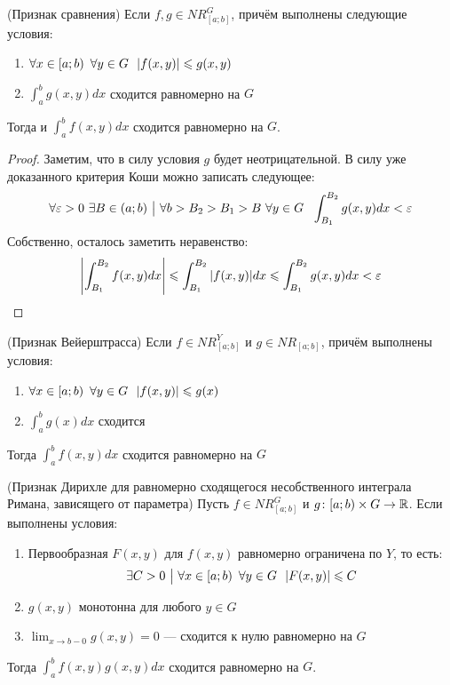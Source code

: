 \begin{theorem} (Признак сравнения)
	Если $f, g \in NR_{[a; b]}^G$, причём выполнены следующие условия:
	\begin{enumerate}
		\item $\forall x \in \left[a; b\right)\ \forall y \in G\ \ |f(x, y)| \leqslant g(x, y)$
		
		\item $\int_a^b g(x, y)dx$ сходится равномерно на $G$
	\end{enumerate}
	Тогда и $\int_a^b f(x, y)dx$ сходится равномерно на $G$.
\end{theorem}

\begin{proof}
	Заметим, что в силу условия $g$ будет неотрицательной. В силу уже доказанного критерия Коши можно записать следующее:
	\[
		\forall \eps > 0\ \exists B \in (a; b) \such \forall b > B_2 > B_1 > B\ \forall y \in G\ \ \int_{B_1}^{B_2} g(x, y)dx < \eps
	\]
	Собственно, осталось заметить неравенство:
	\[
		\left|\int_{B_1}^{B_2} f(x, y)dx\right| \leqslant \int_{B_1}^{B_2} |f(x, y)|dx \leqslant \int_{B_1}^{B_2} g(x, y)dx < \varepsilon
	\]
\end{proof}

\begin{corollary} (Признак Вейерштрасса)
	Если $f \in NR_{[a; b]}^Y$ и $g \in NR_{[a; b]}$, причём выполнены условия:
	\begin{enumerate}
		\item $\forall x \in \left[a; b\right)\ \forall y \in G\ \ |f(x, y)| \leqslant g(x)$
		
		\item $\int_a^b g(x)dx$ сходится
	\end{enumerate}
	Тогда $\int_a^b f(x, y)dx$ сходится равномерно на $G$
\end{corollary}

\begin{theorem} (Признак Дирихле для равномерно сходящегося несобственного интеграла Римана, зависящего от параметра)
	Пусть $f \in NR_{[a; b]}^G$ и $g \colon [a; b) \times G \to \mathbb{R}$. Если выполнены условия:
	\begin{enumerate}
		\item Первообразная $F(x, y)$ для $f(x, y)$ равномерно ограничена по $Y$, то есть:
		\[
			\exists C > 0 \ \big|\  \forall x \in \left[a; b\right)\ \forall y \in G\ \ |F(x, y)| \leqslant C
		\]
	
		\item $g(x, y)$ монотонна для любого $y \in G$
		
		\item $\lim_{x \to b-0} g(x, y) = 0$ --- сходится к нулю равномерно на $G$
	\end{enumerate}
	Тогда $\int_a^b f(x, y)g(x, y)dx$ сходится равномерно на $G$.
\end{theorem}

